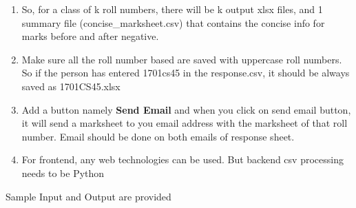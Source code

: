 \documentclass{article}
\begin{document}
\begin{enumerate}
\item So, for a class of k roll numbers, there will be k output xlsx files, 
and 1 summary file (concise\_marksheet.csv) that contains the concise info for 
marks before and after 
negative. 
 
	\item Make sure all the roll number based are saved with uppercase roll 
numbers. So if the person has entered 1701cs45 in the response.csv, it should 
be always saved 
as 1701CS45.xlsx

\item Add a button namely \textbf{Send Email} and when you click on send email 
button, it will send a marksheet to you email address with the marksheet of 
that roll number. Email should be done on both emails of response sheet. 

\item For frontend, any web technologies can be used. But backend csv 
processing needs to be Python
\end{enumerate}

Sample Input and Output are provided

%
%
%
\end{document}
